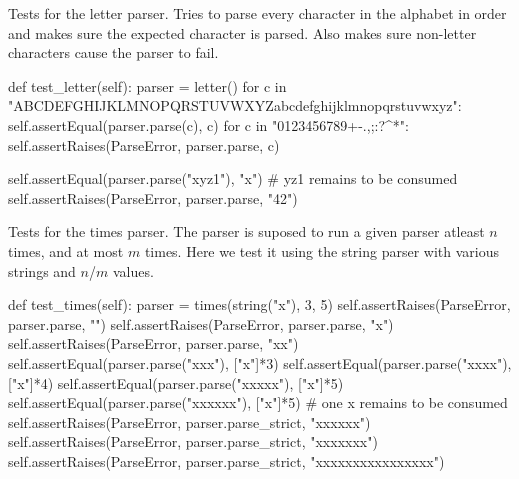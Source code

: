 
Tests for the letter parser. Tries to parse every character in the alphabet in order and makes sure the expected character is parsed.
Also makes sure non-letter characters cause the parser to fail.
\renewcommand{\lstlistingname}{Test}
\begin{python}[caption={Test case for the parser \textit{letter}.}, label=test1]
def test_letter(self):
    parser = letter()
    for c in "ABCDEFGHIJKLMNOPQRSTUVWXYZabcdefghijklmnopqrstuvwxyz":
        self.assertEqual(parser.parse(c), c)
    for c in "0123456789+-.,;:?^*":
        self.assertRaises(ParseError, parser.parse, c)

    self.assertEqual(parser.parse("xyz1"), "x") # yz1 remains to be consumed
    self.assertRaises(ParseError, parser.parse, "42")
\end{python}


Tests for the times parser. The parser is suposed to run a given parser atleast $n$ times, and at most $m$ times. Here we test it using the string parser with various strings and $n$/$m$ values.
\begin{python}[caption={Test case for the parser \textit{times}.}, label=test2]
def test_times(self):
    parser = times(string("x"), 3, 5)
    self.assertRaises(ParseError, parser.parse, "")
    self.assertRaises(ParseError, parser.parse, "x")
    self.assertRaises(ParseError, parser.parse, "xx")
    self.assertEqual(parser.parse("xxx"), ["x"]*3)
    self.assertEqual(parser.parse("xxxx"), ["x"]*4)
    self.assertEqual(parser.parse("xxxxx"), ["x"]*5)
    self.assertEqual(parser.parse("xxxxxx"), ["x"]*5) # one x remains to be consumed
    self.assertRaises(ParseError, parser.parse_strict, "xxxxxx")
    self.assertRaises(ParseError, parser.parse_strict, "xxxxxxx")
    self.assertRaises(ParseError, parser.parse_strict, "xxxxxxxxxxxxxxxx")
\end{python}


